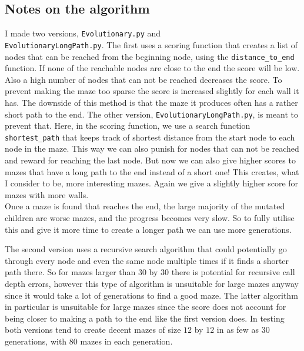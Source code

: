 \documentclass[10pt, a4paper, twoside]{amsart}
\newcommand{\1}{\mathbbm{1}}
\begin{document}
\subsection{Notes on the algorithm}
I made two versions, \verb+Evolutionary.py+ and\\ \verb+EvolutionaryLongPath.py+.
The first uses a scoring function that creates a list of nodes that can be reached from the beginning node, using the \verb+distance_to_end+ function. If none of the reachable nodes are close to the end the score will be low. Also a high number of nodes that can not be reached decreases the score. To prevent making the maze too sparse the score is increased slightly for each wall it has. The downside of this method is that the maze it produces often has a rather short path to the end.
The other version, \verb+EvolutionaryLongPath.py+, is meant to prevent that. Here, in the scoring function, we use a search function \verb+shortest_path+ that keeps track of shortest distance from the start node to each node in the maze. This way we can also punish for nodes that can not be reached and reward for reaching the last node. But now we can also give higher scores to mazes that have a long path to the end instead of a short one! This creates, what I consider to be, more interesting mazes. Again we give a slightly higher score for mazes with more walls.\\
Once a maze is found that reaches the end, the large majority of the mutated children are worse mazes, and the progress becomes very slow. So to fully utilise this and give it more time to create a longer path we can use more generations.

The second version uses a recursive search algorithm that could potentially go through every node and even the same node multiple times if it finds a shorter path there. So for mazes larger than $30$ by $30$ there is potential for recursive call depth errors, however this type of algorithm is unsuitable for large mazes anyway since it would take a lot of generations to find a good maze. The latter algorithm in particular is unsuitable for large mazes since the score does not account for being closer to making a path to the end like the first version does.
In testing both versions tend to create decent mazes of size $12$ by $12$ in as few as $30$ generations, with $80$ mazes in each generation. 
\end{document}

